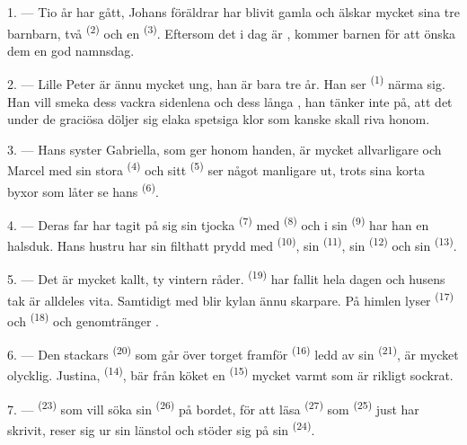 \VUsaut{3.0mm}

1. --- Tio år har gått, Johans föräldrar har blivit gamla och älskar mycket sina
tre barnbarn, två  \textsuperscript{(2)} och en
 \textsuperscript{(3)}. Eftersom det i dag är
, kommer barnen för att önska dem en god namnsdag.

2. --- Lille Peter är ännu mycket ung, han är bara tre år. Han ser
 \textsuperscript{(1)} närma sig. Han vill smeka dess vackra
sidenlena  och dess långa , han tänker inte på, att
det under de graciösa  döljer sig elaka spetsiga klor som
kanske skall riva honom.

3. --- Hans syster Gabriella, som ger honom handen, är mycket allvarligare och
Marcel med sin stora  \textsuperscript{(4)} och sitt 
\textsuperscript{(5)} ser något manligare ut, trots sina korta byxor som låter se
hans  \textsuperscript{(6)}.

4. --- Deras far har tagit på sig sin tjocka 
\textsuperscript{(7)} med  \textsuperscript{(8)} och i sin
 \textsuperscript{(9)} har han en halsduk. Hans hustru har sin
filthatt prydd med  \textsuperscript{(10)}, sin 
\textsuperscript{(11)}, sin  \textsuperscript{(12)} och sin
 \textsuperscript{(13)}.

5. --- Det är mycket kallt, ty vintern råder. 
\textsuperscript{(19)} har fallit hela dagen och husens tak är alldeles vita.
Samtidigt med  blir kylan ännu skarpare. På himlen lyser
 \textsuperscript{(17)} och 
\textsuperscript{(18)} och genomtränger .

\VUsaut{4.2mm}
\VUsaut{3.0mm}

6. --- Den stackars  \textsuperscript{(20)} som går över torget
framför  \textsuperscript{(16)} ledd av sin 
\textsuperscript{(21)}, är mycket olycklig. Justina, 
\textsuperscript{(14)}, bär från köket en  \textsuperscript{(15)}
mycket varmt  som är rikligt sockrat.

7. ---  \textsuperscript{(23)} som vill söka sin
 \textsuperscript{(26)} på bordet, för att läsa 
\textsuperscript{(27)} som  \textsuperscript{(25)} just har
skrivit, reser sig ur sin länstol och stöder sig på sin 
\textsuperscript{(24)}.

